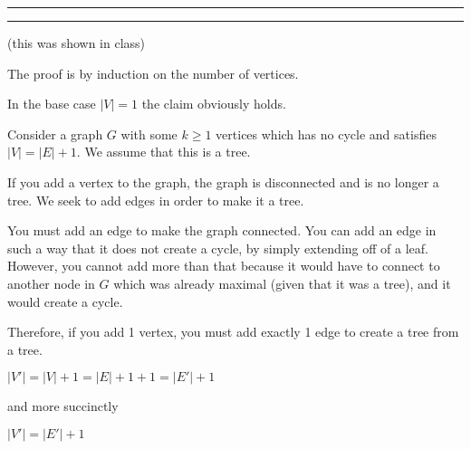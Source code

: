 \documentclass[11pt,letterpaper]{article}
\newcommand{\question}[1] {\vspace{.25in} \hrule\vspace{0.5em}
\noindent{\bf #1} \vspace{0.5em}
\hrule \vspace{.10in}}
\begin{document}
\question{7}
(this was shown in class)

The proof is by induction on the number of vertices.

In the base case $|V| = 1$ the claim obviously holds.

Consider a graph $G$ with some $k \geq 1$ vertices which has no cycle and satisfies $|V| = |E| + 1$.
We assume that this is a tree.

If you add a vertex to the graph, the graph is disconnected and is no longer a tree. We seek to add edges in order to make it a tree.

You must add an edge to make the graph connected. You can add an edge in such a way that it does not create
a cycle, by simply extending off of a leaf. However, you cannot add more than that because it would have to connect
to another node in $G$ which was already maximal (given that it was a tree), and it would create a cycle.

Therefore, if you add 1 vertex, you must add exactly 1 edge to create a tree from a tree.

$|V'| = |V| + 1 = |E| + 1 + 1 = |E'| + 1$

and more succinctly

$|V'| = |E'| + 1$
\end{document}
